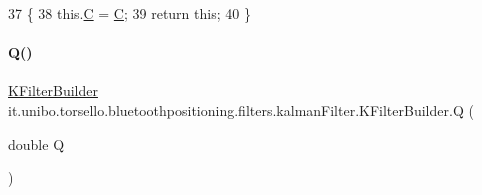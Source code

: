 \begin{DoxyCode}
37                                       \{
38         this.\hyperlink{classit_1_1unibo_1_1torsello_1_1bluetoothpositioning_1_1filters_1_1kalmanFilter_1_1KFilterBuilder_a810bcf844c3b33ba4befbe4ae2698488_a810bcf844c3b33ba4befbe4ae2698488}{C} = \hyperlink{classit_1_1unibo_1_1torsello_1_1bluetoothpositioning_1_1filters_1_1kalmanFilter_1_1KFilterBuilder_a810bcf844c3b33ba4befbe4ae2698488_a810bcf844c3b33ba4befbe4ae2698488}{C};
39         \textcolor{keywordflow}{return} \textcolor{keyword}{this};
40     \}
\end{DoxyCode}
\hypertarget{classit_1_1unibo_1_1torsello_1_1bluetoothpositioning_1_1filters_1_1kalmanFilter_1_1KFilterBuilder_a733c721dce3843456b39f64f54501741_a733c721dce3843456b39f64f54501741}{}\label{classit_1_1unibo_1_1torsello_1_1bluetoothpositioning_1_1filters_1_1kalmanFilter_1_1KFilterBuilder_a733c721dce3843456b39f64f54501741_a733c721dce3843456b39f64f54501741} 
\paragraph{\texorpdfstring{Q()}{Q()}}
{\footnotesize\ttfamily \hyperlink{classit_1_1unibo_1_1torsello_1_1bluetoothpositioning_1_1filters_1_1kalmanFilter_1_1KFilterBuilder}{K\+Filter\+Builder} it.\+unibo.\+torsello.\+bluetoothpositioning.\+filters.\+kalman\+Filter.\+K\+Filter\+Builder.\+Q (\begin{DoxyParamCaption}\item[{double}]{Q }\end{DoxyParamCaption})}


